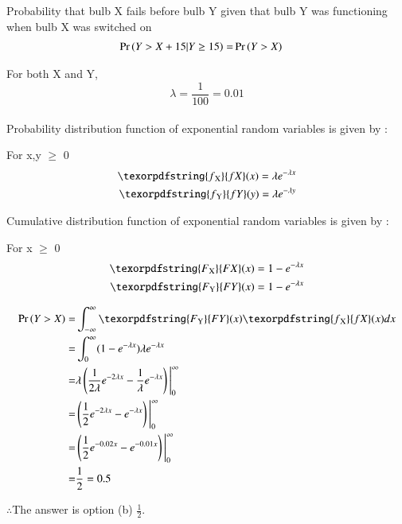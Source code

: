\documentclass[journal,12pt,twocolumn]{IEEEtran}
\begin{document}
Probability that bulb X fails before bulb Y given that bulb Y was functioning when bulb X was switched on 
\begin{align}
  \Pr\left(Y>X+15 | Y \geq 15\right)
  =& \Pr\left(Y>X\right)
\end{align}

For both X and Y,
\begin{equation}
\lambda= \frac{1}{100} = 0.01
\end{equation}
\\
Probability distribution function of exponential random variables is given by : 

For x,y $\geq$ 0
\begin{align}
    \texorpdfstring{f\textsubscript{X}}{f X}(x) = \lambda e^{-\lambda x}\\
    \texorpdfstring{f\textsubscript{Y}}{f Y}(y) = \lambda e^{-\lambda y}
\end{align}

Cumulative distribution function of exponential random variables is given by : 

For x $\geq$ 0
\begin{align}
    \texorpdfstring{F\textsubscript{X}}{F X}(x) = 1- e^{-\lambda x}\\
    \texorpdfstring{F\textsubscript{Y}}{F Y}(x) = 1- e^{-\lambda x}
\end{align}

\begin{align}
    \pr{Y>X} =& \int_{-\infty}^{\infty}  \texorpdfstring{F\textsubscript{Y}}{F Y}(x) \texorpdfstring{f\textsubscript{X}}{f X}(x)  dx\\
    =& \int_{0}^{\infty} ( 1- e^{-\lambda x}) \lambda e^{-\lambda x}\\
    =&  \lambda \brak{\frac{1}{2\lambda} e^{-2\lambda x} - \frac{1}{\lambda} e^{-\lambda x}} \Bigg|_0^\infty\\
     =& \brak{\frac{1}{2} e^{-2\lambda x} - e^{-\lambda x}} \Bigg|_0^\infty\\
    =& \brak{\frac{1}{2} e^{-0.02x} - e^{-0.01x}} \Bigg|_0^\infty\\
    =& \frac{1}{2} = 0.5
\end{align}

 $\therefore$The answer is option (b) \large $\frac{1}{2}$.
\end{document}
